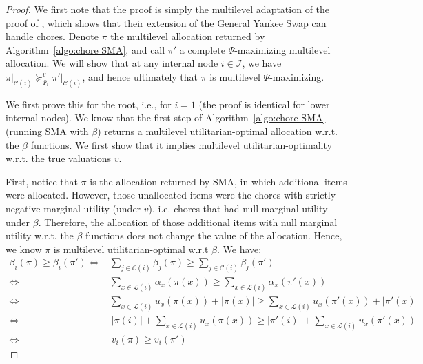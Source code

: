 \documentclass[]{article}
\newcommand{\children}{\mathcal{C}}
\newcommand{\leaves}{\mathcal{L}}
\newcommand{\internal}{\mathcal{I}}
\begin{document}
\begin{proof}
    We first note that the proof is simply the multilevel adaptation of the proof of \cite{Viswanathan_Zick2023b}, which shows that their extension of the General Yankee Swap can handle chores. Denote $\pi$ the multilevel allocation returned by Algorithm~\ref{algo:chore SMA}, and call $\pi'$ a complete $\Psi$-maximizing multilevel allocation. We will show that at any internal node $i \in \internal$, we have $\pi \vert_{\children(i)} \succeq^v_{\Psi_i} \pi' \vert_{\children(i)}$, and hence ultimately that $\pi$ is multilevel $\Psi$-maximizing. 

    We first prove this for the root, i.e., for $i=1$  (the proof is identical for lower internal nodes). We know that the first step of Algorithm~\ref{algo:chore SMA} (running SMA with $\beta$) returns a multilevel utilitarian-optimal allocation w.r.t. the $\beta$ functions. We first show that it implies multilevel utilitarian-optimality w.r.t. the true valuations $v$.

    First, notice that $\pi$ is the allocation returned by SMA, in which additional items were allocated. However, those unallocated items were the chores with strictly negative marginal utility (under $v$), i.e. chores that had null marginal utility under $\beta$. Therefore, the allocation of those additional items with null marginal utility w.r.t. the $\beta$ functions does not change the value of the allocation. Hence, we know $\pi$ is multilevel utilitarian-optimal w.r.t $\beta$. We have: 
    \begin{align*}
        \beta_i(\pi) \geq \beta_i(\pi') 
        \Leftrightarrow &\sum_{j \in \children(i)} \beta_j(\pi) \geq \sum_{j \in \children(i)} \beta_j(\pi') \\
        \Leftrightarrow & \sum_{x \in \leaves(i)} \alpha_x(\pi(x)) \geq \sum_{x \in \leaves(i)} \alpha_x(\pi'(x)) \\
        \Leftrightarrow & \sum_{x \in \leaves(i)} u_x(\pi(x)) + |\pi(x)| \geq \sum_{x \in \leaves(i)} u_x(\pi'(x)) + |\pi'(x)| \\
        \Leftrightarrow & \ |\pi(i)| + \sum_{x \in \leaves(i)} u_x(\pi(x)) \geq |\pi'(i)| + \sum_{x \in \leaves(i)} u_x(\pi'(x)) \\
        \Leftrightarrow & \ v_i(\pi) \geq v_i(\pi')
    \end{align*}


\end{proof}
\end{document}
